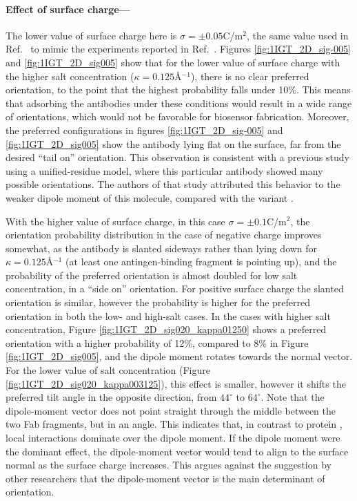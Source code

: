  \medskip
 
 \paragraph*{Effect of surface charge---}
 
The lower value of surface charge here is $\sigma=\pm 0.05$C/m$^2$, the same value used in Ref.~ to mimic the experiments reported in Ref.~. 
Figures \ref{fig:1IGT_2D_sig-005} and \ref{fig:1IGT_2D_sig005} show that for the lower value of surface charge with the higher salt concentration ($\kappa=0.125$\AA$^{-1}$), there is no clear preferred orientation, to the point that the highest probability falls under 10\%. 
This means that adsorbing the antibodies under these conditions would result in a wide range of orientations, which would not be favorable for biosensor fabrication.
Moreover, the preferred configurations in figures \ref{fig:1IGT_2D_sig-005} and \ref{fig:1IGT_2D_sig005} show the antibody lying flat on the surface, far from the desired ``tail on'' orientation. 
This observation is consistent with a previous study using a unified-residue model,\cite{ZhouChenJiang2003} where this particular antibody showed many possible orientations. 
The authors of that study attributed this behavior to the weaker dipole moment of this molecule, compared with the variant .
 
With the higher value of surface charge, in this case $\sigma=\pm0.1$C/m$^2$, the orientation probability distribution in the case of negative charge improves somewhat, as the antibody is slanted sideways rather than lying down for $\kappa=0.125$\AA$^{-1}$ (at least one antingen-binding fragment is pointing up), and the probability of the preferred orientation is almost doubled for low salt concentration, in a ``side on'' orientation.
For positive surface charge the slanted orientation is similar, however the probability is higher for the preferred orientation in both the low- and high-salt cases.
In the cases with higher salt concentration, Figure \ref{fig:1IGT_2D_sig020_kappa01250} shows a preferred orientation with a higher probability of 12\%, compared to 8\% in Figure \ref{fig:1IGT_2D_sig005}, and the dipole moment rotates towards the normal vector. 
For the lower value of salt concentration (Figure \ref{fig:1IGT_2D_sig020_kappa003125}), this effect is smaller, however it shifts the preferred tilt angle in the opposite direction, from $44^{\circ}$ to $64^{\circ}$. Note that the dipole-moment vector does not point straight through the middle between the two Fab fragments, but in an angle.
This indicates that, in contrast to protein \gb, local interactions dominate over the dipole moment. If the dipole moment were the dominant effect, the dipole-moment vector would tend to align to the surface normal as the surface charge increases.
This argues against the suggestion by other researchers\cite{ChenLiuZhouJiang2003,ZhouChenJiang2003} that the dipole-moment vector is the main determinant of orientation.
 
